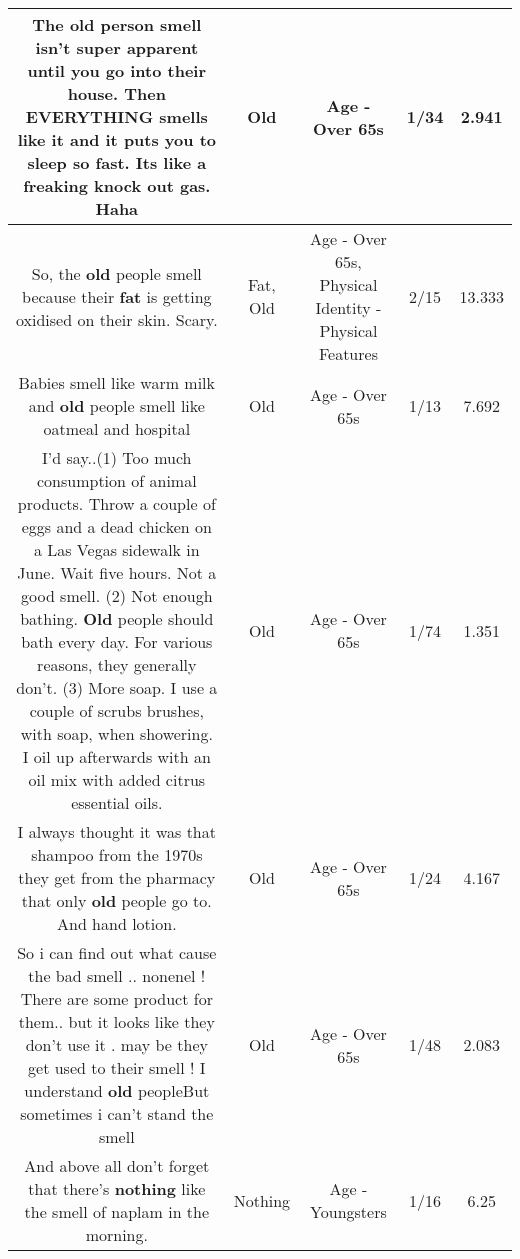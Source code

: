 \documentclass[11pt]{article}
\newlength\mylength
\begin{document}
\begin{center}
\begin{longtable}{|C{.65\mylength}|C{.30\mylength}|C{.12\mylength}|C{.12\mylength}|C{.12\mylength}|}
  \small The \textbf{old} person smell isn't super apparent until you go into their house. Then EVERYTHING smells like it and it puts you to sleep so fast. Its like a freaking knock out gas. Haha\normalsize   & Old & Age - Over 65s & 1/34 & 2.941 \\  \hline
  \small So, the \textbf{old} people smell because their \textbf{fat} is getting oxidised on their skin. Scary.\normalsize   & Fat, Old & Age - Over 65s, Physical Identity - Physical Features & 2/15 & 13.333 \\  \hline
  \small Babies smell like warm milk and \textbf{old} people smell like oatmeal and hospital\normalsize   & Old & Age - Over 65s & 1/13 & 7.692 \\  \hline
  \small I'd say..(1) Too much consumption of animal products.  Throw a couple of eggs and a dead chicken on a Las Vegas sidewalk in June.  Wait five hours.  Not a good smell.  (2) Not enough bathing.  \textbf{Old} people should bath every day.  For various reasons, they generally don't.   (3)  More soap.  I use a couple of scrubs brushes, with soap, when showering.  I oil up afterwards with an oil mix with added citrus essential oils.\normalsize   & Old & Age - Over 65s & 1/74 & 1.351 \\  \hline
  \small I always thought it was that shampoo from the 1970s they get from the pharmacy that only \textbf{old} people go to.  And hand lotion.\normalsize   & Old & Age - Over 65s & 1/24 & 4.167 \\  \hline
  \small So i can find out what cause the bad smell .. nonenel ! There are some product for them.. but it looks like they don't use it . may be they get used to their smell ! I understand \textbf{old} peopleBut sometimes i can't stand the smell\normalsize   & Old & Age - Over 65s & 1/48 & 2.083 \\  \hline
  \small And above all don't forget that there's \textbf{nothing} like the smell of naplam in the morning.\normalsize   & Nothing & Age - Youngsters & 1/16 & 6.25 \\  \hline

\end{longtable}
\end{center}
\end{document}
